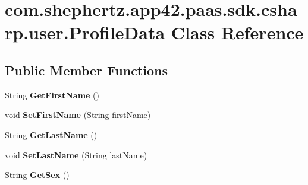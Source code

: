 \hypertarget{classcom_1_1shephertz_1_1app42_1_1paas_1_1sdk_1_1csharp_1_1user_1_1_profile_data}{\section{com.\+shephertz.\+app42.\+paas.\+sdk.\+csharp.\+user.\+Profile\+Data Class Reference}
\label{classcom_1_1shephertz_1_1app42_1_1paas_1_1sdk_1_1csharp_1_1user_1_1_profile_data}
}
\subsection*{Public Member Functions}
\begin{DoxyCompactItemize}
\item 
\hypertarget{classcom_1_1shephertz_1_1app42_1_1paas_1_1sdk_1_1csharp_1_1user_1_1_profile_data_a0572c3fbfa1556084eda5baf86ce665e}{String {\bfseries Get\+First\+Name} ()}\label{classcom_1_1shephertz_1_1app42_1_1paas_1_1sdk_1_1csharp_1_1user_1_1_profile_data_a0572c3fbfa1556084eda5baf86ce665e}

\item 
\hypertarget{classcom_1_1shephertz_1_1app42_1_1paas_1_1sdk_1_1csharp_1_1user_1_1_profile_data_ad8389c25e334395bea023cda5125cfad}{void {\bfseries Set\+First\+Name} (String first\+Name)}\label{classcom_1_1shephertz_1_1app42_1_1paas_1_1sdk_1_1csharp_1_1user_1_1_profile_data_ad8389c25e334395bea023cda5125cfad}

\item 
\hypertarget{classcom_1_1shephertz_1_1app42_1_1paas_1_1sdk_1_1csharp_1_1user_1_1_profile_data_ac13a667ffb3ebcc04cc2c8184df931e8}{String {\bfseries Get\+Last\+Name} ()}\label{classcom_1_1shephertz_1_1app42_1_1paas_1_1sdk_1_1csharp_1_1user_1_1_profile_data_ac13a667ffb3ebcc04cc2c8184df931e8}

\item 
\hypertarget{classcom_1_1shephertz_1_1app42_1_1paas_1_1sdk_1_1csharp_1_1user_1_1_profile_data_a22662f094275eba552e7bb606009d29f}{void {\bfseries Set\+Last\+Name} (String last\+Name)}\label{classcom_1_1shephertz_1_1app42_1_1paas_1_1sdk_1_1csharp_1_1user_1_1_profile_data_a22662f094275eba552e7bb606009d29f}

\item 
\hypertarget{classcom_1_1shephertz_1_1app42_1_1paas_1_1sdk_1_1csharp_1_1user_1_1_profile_data_ae226ec4b4210e15b68e6870094a736ef}{String {\bfseries Get\+Sex} ()}\label{classcom_1_1shephertz_1_1app42_1_1paas_1_1sdk_1_1csharp_1_1user_1_1_profile_data_ae226ec4b4210e15b68e6870094a736ef}


\end{DoxyCompactItemize}
